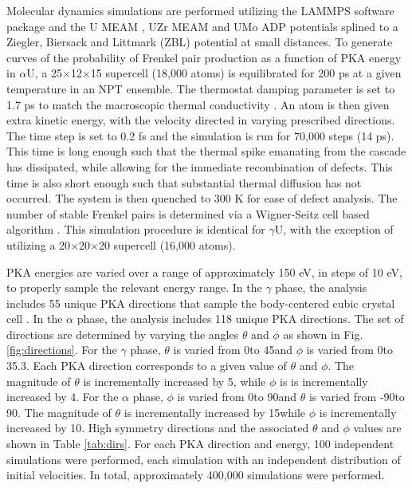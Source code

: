 \documentclass[review]{elsarticle}
\begin{document}
Molecular dynamics simulations are performed utilizing the LAMMPS \cite{plimpton1995} software package and the U MEAM \cite{beeler_meam}, UZr MEAM \cite{moore2015} and UMo ADP \cite{smirnovaADP} potentials splined to a Ziegler, Biersack and Littmark (ZBL) \cite{zbl} potential at small distances. To generate curves of the probability of Frenkel pair production as a function of PKA energy in $\alpha$U, a 25$\times$12$\times$15 supercell (18,000 atoms) is equilibrated for 200 ps at a given temperature in an NPT ensemble. The thermostat damping parameter is set to 1.7 ps to match the macroscopic thermal conductivity \cite{lane2012}. An atom is then given extra kinetic energy, with the velocity directed in varying prescribed directions. The time step is set to 0.2 fs and the simulation is run for 70,000 steps (14 ps). This time is long enough such that the thermal spike emanating from the cascade has dissipated, while allowing for the immediate recombination of defects. This time is also short enough such that substantial thermal diffusion has not occurred. The system is then quenched to 300 K for ease of defect analysis. The number of stable Frenkel pairs is determined via a Wigner-Seitz cell based algorithm \cite{hayward2010}. This simulation procedure is identical for $\gamma$U, with the exception of utilizing a 20$\times$20$\times$20 supercell (16,000 atoms). 

PKA energies are varied over a range of approximately 150 eV, in steps of 10 eV, to properly sample the relevant energy range. In the $\gamma$ phase, the analysis includes 55 unique PKA directions that sample the body-centered cubic crystal cell \cite{beeler2015}. In the $\alpha$ phase, the analysis includes 118 unique PKA directions. The set of directions are determined by varying the angles $\theta$ and $\phi$ as shown in Fig. \ref{fig:directions}. For the $\gamma$ phase, $\theta$ is varied from 0\degree to 45\degree and $\phi$ is varied from 0\degree to 35.3\degree. Each PKA direction corresponds to a given value of $\theta$ and $\phi$. The magnitude of $\theta$ is incrementally increased by 5\degree, while $\phi$ is is incrementally increased by 4\degree. For the $\alpha$ phase, $\phi$ is varied from 0\degree to 90\degree and $\theta$ is varied from -90\degree to 90\degree. The magnitude of $\theta$ is incrementally increased by 15\degree  while $\phi$ is incrementally increased by 10\degree. High symmetry directions and the associated $\theta$ and $\phi$ values are shown in Table \ref{tab:dirs}. For each PKA direction and energy, 100 independent simulations were performed, each simulation with an independent distribution of initial velocities. In total, approximately 400,000 simulations were performed. 
\end{document}
